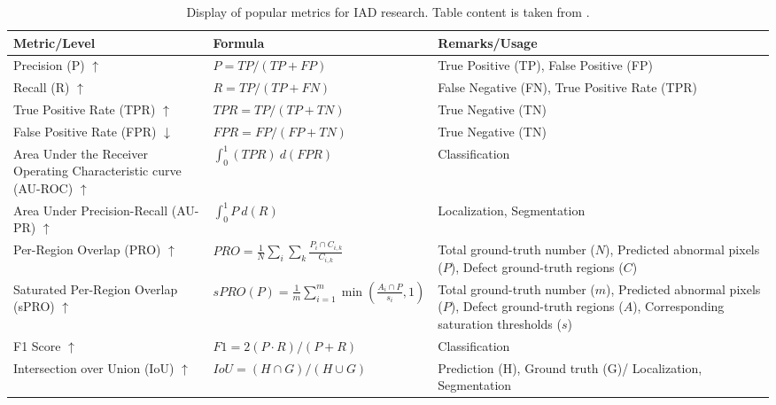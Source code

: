 \begin{table}[htbp]
    \tiny
    \centering
    \begin{tabularx}{\textwidth}{| >{\raggedright\arraybackslash}X| >{\raggedright\arraybackslash}X| >{\raggedright\arraybackslash}X|}%
        \hline
        \textbf{Metric/Level} & \textbf{Formula} & \textbf{Remarks/Usage} \\
        \hline
        Precision (P) $\uparrow$ & $P = TP/(TP + FP)$ & True Positive (TP), False Positive (FP) \\
        \hline
        Recall (R) $\uparrow$ & $R = TP/(TP + FN)$ & False Negative (FN), True Positive Rate (TPR) \\
        \hline
        True Positive Rate (TPR) $\uparrow$ & $TPR = TP/(TP + TN)$ & True Negative (TN) \\
        \hline
        False Positive Rate (FPR) $\downarrow$ & $FPR = FP/(FP + TN)$ & True Negative (TN) \\
        \hline
        Area Under the Receiver Operating Characteristic curve (AU-ROC) $\uparrow$ & $ \int_{0}^{1} (TPR) \: d(FPR)$ & Classification \\
        \hline
        Area Under Precision-Recall (AU-PR) $\uparrow$ & $\int_{0}^{1} P \: d(R)$ & Localization, Segmentation \\
        \hline
        Per-Region Overlap (PRO) $\uparrow$ & $PRO = \frac{1}{N} \sum_{i} \sum_{k} \frac{P_i \cap C_{i,k}}{C_{i,k}}$ & Total ground-truth number (\(N\)), Predicted abnormal pixels (\(P\)), Defect ground-truth regions (\(C\)) \\
        \hline
        Saturated Per-Region Overlap (sPRO) $\uparrow$ & $sPRO(P) = \frac{1}{m} \sum_{i=1}^{m} \min(\frac{A_i \cap P}{s_i}, 1)$ & Total ground-truth number (\(m\)), Predicted abnormal pixels (\(P\)), Defect ground-truth regions (\(A\)), Corresponding saturation thresholds (\(s\)) \\
        \hline
        F1 Score $\uparrow$ & $F1 = 2(P \cdot R)/(P + R)$ & Classification \\
        \hline
        Intersection over Union (IoU) $\uparrow$ & $IoU = (H \cap G)/(H \cup G)$ & Prediction (H), Ground truth (G)/ Localization, Segmentation \\
        \hline
    \end{tabularx}
    \caption{Display of popular metrics for IAD research. Table content is taken from \cite{liu2024deep}.}
    \label{tab:metrics}
\end{table}



